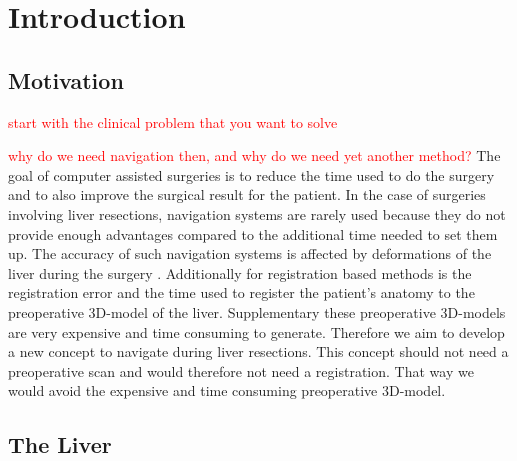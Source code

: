 %
%
%

\chapter{Introduction}
\section{Motivation} 
\textcolor{red}{start with the clinical problem that you want to solve}

\textcolor{red}{why do we need navigation then, and why do we need yet another method?}
The goal of computer assisted surgeries is to reduce the time used to do the
surgery and to also improve the surgical result for the patient. In the case of
surgeries involving liver resections, navigation systems are rarely used because
they do not provide enough advantages compared to the additional time needed to
set them up. The accuracy of such navigation systems is affected by
deformations of the liver during the surgery \cite{clements2017deformation}.
Additionally for registration based methods is the registration error and the
time used to register the patient's anatomy to the preoperative 3D-model of the
liver. Supplementary these preoperative 3D-models are very expensive and time
consuming to generate. Therefore we aim to develop a new concept to navigate
during liver resections. This concept should not need a preoperative scan and would therefore
not need a registration. That way we would avoid the expensive and time
consuming preoperative 3D-model. 
\section{The Liver} 
